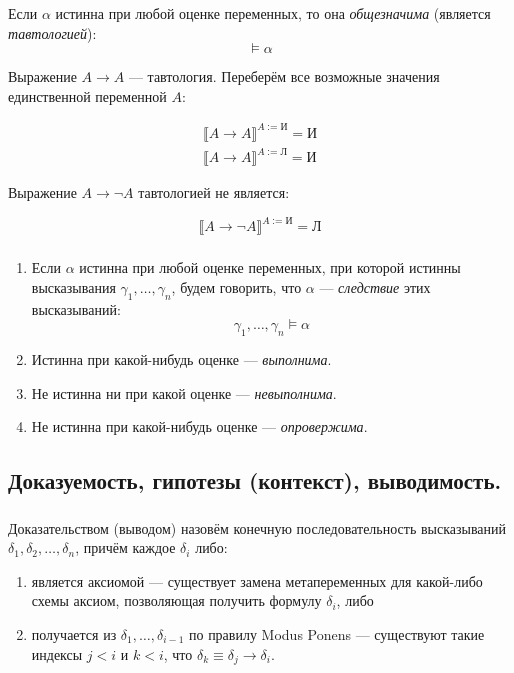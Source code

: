 \documentclass[10pt,a4paper,oneside]{article}
\begin{document}
\subsubsection{}

Если $\alpha$ истинна при любой оценке переменных, то она \emph{общезначима} (является \emph{тавтологией}):
$$\models \alpha$$


Выражение $A\rightarrow A$ --- тавтология. 
Переберём все возможные значения единственной переменной $A$:

$$
\begin{array}{l} \llbracket A\rightarrow A \rrbracket ^ {A := \textit{И}} = \textit{И} \\
 \llbracket A\rightarrow A \rrbracket ^ {A := \textit{Л}} = \textit{И} \end{array}
$$

Выражение $A\rightarrow\neg A$ тавтологией не является:

$$\llbracket A\rightarrow\neg A \rrbracket ^ {A := \textit{И}} = \textit{Л}$$

\subsubsection{}
\begin{enumerate}
    \item Если $\alpha$ истинна при любой оценке переменных, при которой истинны 
    высказывания $\gamma_1, \dots, \gamma_n$, будем говорить, что $\alpha$ --- \emph{следствие} этих высказываний:
    $$\gamma_1, \dots, \gamma_n \models \alpha$$
    \item Истинна при какой-нибудь оценке --- \emph{выполнима}.
    \item Не истинна ни при какой оценке --- \emph{невыполнима}.
    \item Не истинна при какой-нибудь оценке --- \emph{опровержима}.
\end{enumerate}

\subsection{Доказуемость, гипотезы (контекст), выводимость.}
\subsubsection{}
Доказательством (выводом) назовём конечную последовательность высказываний $\delta_1, \delta_2, \dots, \delta_n$,
причём каждое $\delta_i$ либо:
\begin{enumerate}
\item является аксиомой --- существует замена метапеременных для какой-либо схемы аксиом, позволяющая получить
формулу $\delta_i$, либо
\item получается из $\delta_1,\dots,\delta_{i-1}$ по правилу Modus Ponens --- существуют такие индексы $j < i$ и $k < i$,
что $\delta_k \equiv \delta_j\rightarrow\delta_i$.
\end{enumerate}
\end{document}
